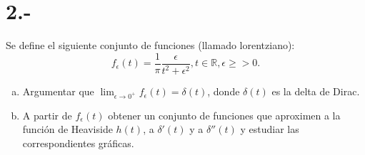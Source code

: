 \documentclass{article}
\begin{document}
\section*{2.-}
Se define el siguiente conjunto de funciones (llamado lorentziano):
\[
f_\epsilon(t)=\frac{1}{\pi}\frac{\epsilon}{t^2+\epsilon^2}, t\in\mathbb{R}, 
\epsilon \ge>0.
\]
\begin{enumerate}[a)]
    \item Argumentar que $\lim_{\epsilon\to0^+}f_\epsilon(t)=\delta(t)$, 
    donde $\delta(t)$ es la delta de Dirac. 
    \item A partir de $f_\epsilon(t)$ obtener un conjunto de funciones que aproximen a la función de Heaviside $h(t)$, a $\delta'(t)$ y 
    a $\delta''(t)$ y estudiar las correspondientes gráficas. 
\end{enumerate}
\begin{tcolorbox}

\end{tcolorbox}
\end{document}
